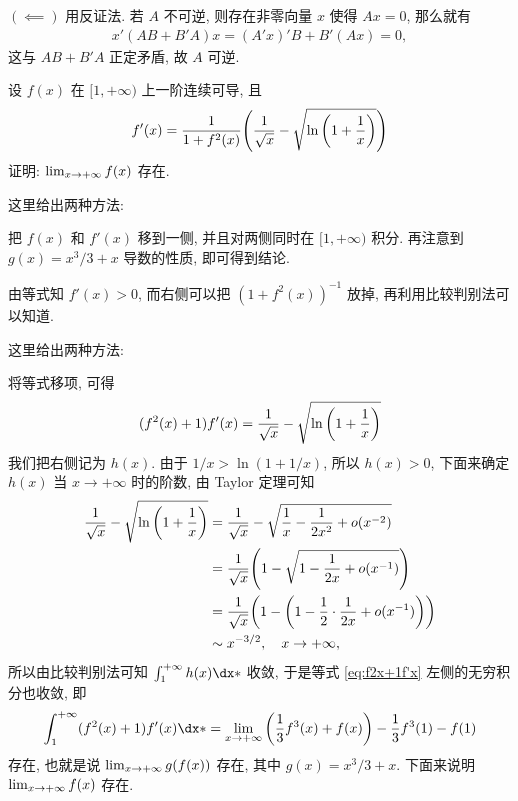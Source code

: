 \begin{exercise}[series=exer]
\begin{answer}
      $ (\impliedby) $ 用反证法. 若 $ A $ 不可逆, 则存在非零向量 $ x $ 使得 $ Ax = 0 $, 那么就有
      \begin{align*}
          x'(AB + B'A)x = (A'x)'B + B'(Ax) = 0,
      \end{align*}
      这与 $ AB + B'A $ 正定矛盾, 故 $ A $ 可逆.
  \end{answer}
  \item
  \item 设 $ f(x) $ 在 $ [1, +\infty) $ 上一阶连续可导, 且
  \begin{align*}
      f'(x) = \frac{1}{1 + f^{2}(x)}\qty(\frac{1}{\sqrt{x}} - \sqrt{\ln\qty(1 + \frac{1}{x})})
  \end{align*}
  证明: $ \lim_{x \to +\infty}f(x) $ 存在.
  \begin{hint}
      这里给出两种方法:
      \begin{method}
      \item 把 $ f(x) $ 和 $ f'(x) $ 移到一侧, 并且对两侧同时在 $ [1, +\infty) $ 积分. 再注意到 $ g(x) = x^{3}/3 + x $ 导数的性质, 即可得到结论.
      \item 由等式知 $ f'(x) > 0 $, 而右侧可以把 $ (1 + f^{2}(x))^{-1} $ 放掉, 再利用比较判别法可以知道.
      \end{method}
  \end{hint}
  \begin{answer}
      这里给出两种方法:
      \begin{method}
          \item\label{method:移项积分} 将等式移项, 可得
          \begin{align}\label{eq:f2x+1f'x}
              (f^{2}(x) + 1)f'(x) = \frac{1}{\sqrt{x}} - \sqrt{\ln\qty(1 + \frac{1}{x})}
          \end{align}
          我们把右侧记为 $ h(x) $. 由于 $ 1/x > \ln(1 + 1/x) $, 所以 $ h(x) > 0 $, 下面来确定 $ h(x) $ 当 $ x \to +\infty $ 时的阶数, 由 Taylor 定理可知
          \begin{align*}
              \frac{1}{\sqrt{x}} - \sqrt{\ln\qty(1 + \frac{1}{x})} & = \frac{1}{\sqrt{x}} - \sqrt{\frac{1}{x} - \frac{1}{2x^{2}} + o(x^{-2})} \\
              & = \frac{1}{\sqrt{x}}\qty(1 - \sqrt{1 - \frac{1}{2x} + o(x^{-1})})\\
              & = \frac{1}{\sqrt{x}}\qty(1 - \qty(1 - \frac{1}{2} \cdot \frac{1}{2x} + o(x^{-1})))\\
              & \sim x^{-3/2}, \quad x \to +\infty,
          \end{align*}
          所以由比较判别法可知 $ \int_{1}^{+\infty} h(x) \dx* $ 收敛, 于是等式 \eqref{eq:f2x+1f'x} 左侧的无穷积分也收敛, 即
          \begin{align*}
              \int_{1}^{+\infty} (f^{2}(x) + 1)f'(x) \dx* = \limit{x}{+\infty} \qty(\frac{1}{3}f^{3}(x) + f(x)) - \frac{1}{3}f^{3}(1) - f(1)
          \end{align*}
          存在, 也就是说 $ \lim_{x \to +\infty} g(f(x)) $ 存在, 其中 $ g(x) = x^{3}/3 + x $. 下面来说明 $ \lim_{x \to +\infty} f(x) $ 存在.


\end{method}
\end{answer}
\end{exercise}
